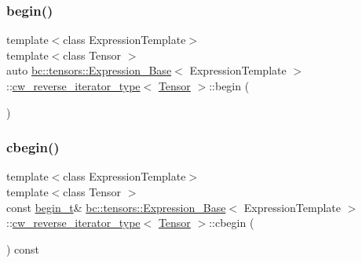 \subsubsection{\texorpdfstring{begin()}{begin()}}
{\footnotesize\ttfamily template$<$class Expression\+Template$>$ \\
template$<$class Tensor $>$ \\
auto \hyperlink{classbc_1_1tensors_1_1Expression__Base}{bc\+::tensors\+::\+Expression\+\_\+\+Base}$<$ Expression\+Template $>$\+::\hyperlink{structbc_1_1tensors_1_1Expression__Base_1_1cw__reverse__iterator__type}{cw\+\_\+reverse\+\_\+iterator\+\_\+type}$<$ \hyperlink{namespacebc_a659391e47ab612be3ba6c18cf9c89159}{Tensor} $>$\+::begin (\begin{DoxyParamCaption}{ }\end{DoxyParamCaption})\hspace{0.3cm}{\ttfamily [inline]}}

\mbox{\label{structbc_1_1tensors_1_1Expression__Base_1_1cw__reverse__iterator__type_ae1cff1d94bd1fdb55b8a926d896a0030}} 
\subsubsection{\texorpdfstring{cbegin()}{cbegin()}}
{\footnotesize\ttfamily template$<$class Expression\+Template$>$ \\
template$<$class Tensor $>$ \\
const \hyperlink{structbc_1_1tensors_1_1Expression__Base_1_1cw__reverse__iterator__type_a63231d68ab487d4d24996e7a538fc427}{begin\+\_\+t}\& \hyperlink{classbc_1_1tensors_1_1Expression__Base}{bc\+::tensors\+::\+Expression\+\_\+\+Base}$<$ Expression\+Template $>$\+::\hyperlink{structbc_1_1tensors_1_1Expression__Base_1_1cw__reverse__iterator__type}{cw\+\_\+reverse\+\_\+iterator\+\_\+type}$<$ \hyperlink{namespacebc_a659391e47ab612be3ba6c18cf9c89159}{Tensor} $>$\+::cbegin (\begin{DoxyParamCaption}{ }\end{DoxyParamCaption}) const\hspace{0.3cm}{\ttfamily [inline]}}


